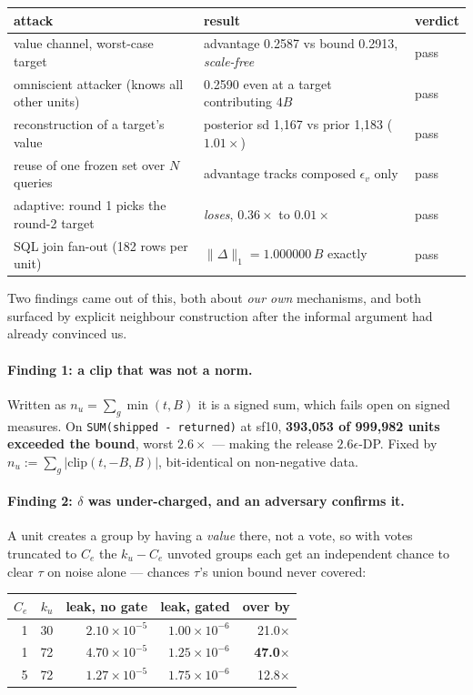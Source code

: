 \documentclass[11pt,a4paper]{article}
\newcommand{\lose}{\color{red}}
\newcommand{\Ce}{C_e}
\newcommand{\ku}{k_u}
\begin{document}
\begin{center}\small
\begin{tabular}{lll}
\toprule
attack & result & verdict \\
\midrule
value channel, worst-case target & advantage 0.2587 vs bound 0.2913, \emph{scale-free} & pass \\
omniscient attacker (knows all other units) & 0.2590 even at a target contributing $4B$ & pass \\
reconstruction of a target's value & posterior sd 1,167 vs prior 1,183 ($1.01\times$) & pass \\
reuse of one frozen set over $N$ queries & advantage tracks composed $\epsilon_v$ only & pass \\
adaptive: round 1 picks the round-2 target & \emph{loses}, $0.36\times$ to $0.01\times$ & pass \\
SQL join fan-out (182 rows per unit) & $\|\Delta\|_1 = 1.000000\,B$ exactly & pass \\
\bottomrule
\end{tabular}
\end{center}

Two findings came out of this, both about \emph{our own} mechanisms, and both surfaced by explicit
neighbour construction after the informal argument had already convinced us.

\paragraph{Finding 1: a clip that was not a norm.} Written as $n_u = \sum_g \min(t,B)$ it is a signed
sum, which fails open on signed measures. On \texttt{SUM(shipped - returned)} at sf10,
\textbf{393,053 of 999,982 units exceeded the bound}, worst $2.6\times$ --- making the release
$2.6\epsilon$-DP. Fixed by $n_u := \sum_g|\mathrm{clip}(t,-B,B)|$, bit-identical on non-negative
data.

\paragraph{Finding 2: $\delta$ was under-charged, and an adversary confirms it.} A unit creates a group by
having a \emph{value} there, not a vote, so with votes truncated to $\Ce$ the $\ku-\Ce$ unvoted
groups each get an independent chance to clear $\tau$ on noise alone --- chances $\tau$'s union
bound never covered:

\begin{center}\small
\begin{tabular}{rrrrr}
\toprule
$\Ce$ & $\ku$ & leak, no gate & leak, gated & over by \\
\midrule
1 & 30 & $2.10\times10^{-5}$ & $1.00\times10^{-6}$ & \lose 21.0$\times$ \\
1 & 72 & $4.70\times10^{-5}$ & $1.25\times10^{-6}$ & \lose \textbf{47.0$\times$} \\
5 & 72 & $1.27\times10^{-5}$ & $1.75\times10^{-6}$ & \lose 12.8$\times$ \\
\bottomrule
\end{tabular}
\end{center}
\end{document}
